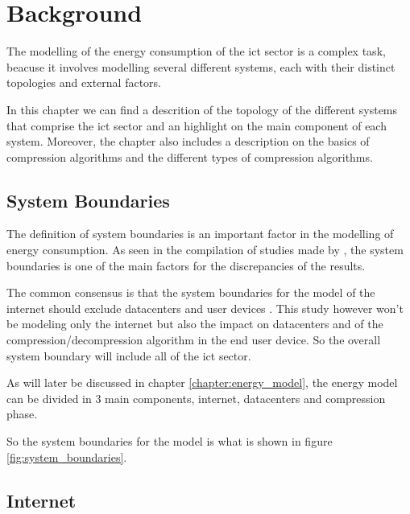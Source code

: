 

\chapter{Background}
\label{chapter:background}

\begin{introduction}
    
    The modelling of the energy consumption of the \ac{ict} sector is a complex task, beacuse it involves modelling several different systems, each with their distinct topologies and external factors.

    In this chapter we can find a descrition of the topology of the different systems that comprise the \ac{ict} sector and an highlight on the main component of each system. Moreover, the chapter also includes a description on the basics of compression algorithms and the different types of compression algorithms.

\end{introduction}

\section{System Boundaries}

The definition of system boundaries is an important factor in the modelling of energy consumption. As seen in the compilation of studies made by \citet{Aslan2018}, the system boundaries is one of the main factors for the discrepancies of the results.

The common consensus is that the system boundaries for the model of the internet should exclude datacenters and user devices \citet{Coroama2014}. This study however won't be modeling only the internet but also the impact on datacenters and of the compression/decompression algorithm in the end user device. So the overall system boundary will include all of the \ac{ict} sector. 

As will later be discussed in chapter \ref{chapter:energy_model}, the energy model can be divided in 3 main components, internet, datacenters and compression phase.

So the system boundaries for the model is what is shown in figure \ref{fig:system_boundaries}.

\section{Internet}

